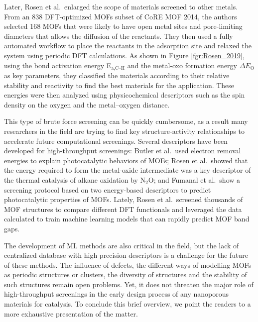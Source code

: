 \documentclass[main.tex]{subfiles}
\begin{document}
Later, Rosen et al.\ enlarged the scope of materials screened to other metals.\cite{Rosen_2019} From an 838 DFT-optimized MOFs subset of CoRE MOF 2014, the authors selected 168 MOFs that were likely to have open metal sites and pore-limiting diameters that allows the diffusion of the reactants. They then used a fully automated workflow to place the reactants in the adsorption site and relaxed the system using periodic DFT calculations. As shown in Figure \ref{fgr:Rosen_2019}, using the bond activation energy E$_\text{a,C--H}$ and the metal-oxo formation energy $\Delta E_\text{O}$ as key parameters, they classified the materials according to their relative stability and reactivity to find the best materials for the application. These energies were then analyzed using physicochemical descriptors such as the spin density on the oxygen and the metal--oxygen distance.

This type of brute force screening can be quickly cumbersome, as a result many researchers in the field are trying to find key structure-activity relationships to accelerate future computational screenings.
Several descriptors have been developed for high-throughput screenings: Butler et al.\ used electron removal energies to explain photocatalytic behaviors of MOFs;\cite{Butler_2014} Rosen et al.\ showed that the energy required to form the metal-oxide intermediate was a key descriptor of the thermal catalysis of alkane oxidation by N$_2$O;\cite{Rosen_HTPDFT_2019} and Fumanal et al.\ show a screening protocol based on two energy-based descriptors to predict photocatalytic properties of MOFs.\cite{Fumanal_descriptor_2020} {Lately, Rosen et al.\ screened thousands of MOF structures to compare different DFT functionals and leveraged the data calculated to train machine learning models that can rapidly predict MOF band gaps.\cite{Rosen_2022_high} }

The development of ML methods are also critical in the field,\cite{Rosen_2021} but the lack of centralized database with high precision descriptors is a challenge for the future of these methods. The influence of defects, the different ways of modelling MOFs as periodic structures or clusters, the diversity of structures and the stability of such structures remain open problems. Yet, it does not threaten the major role of high-throughput screenings in the early design process of any nanoporous materials for catalysis. To conclude this brief overview, we point the readers to a more exhaustive presentation of the matter.\cite{Rosen_2022}
\end{document}
